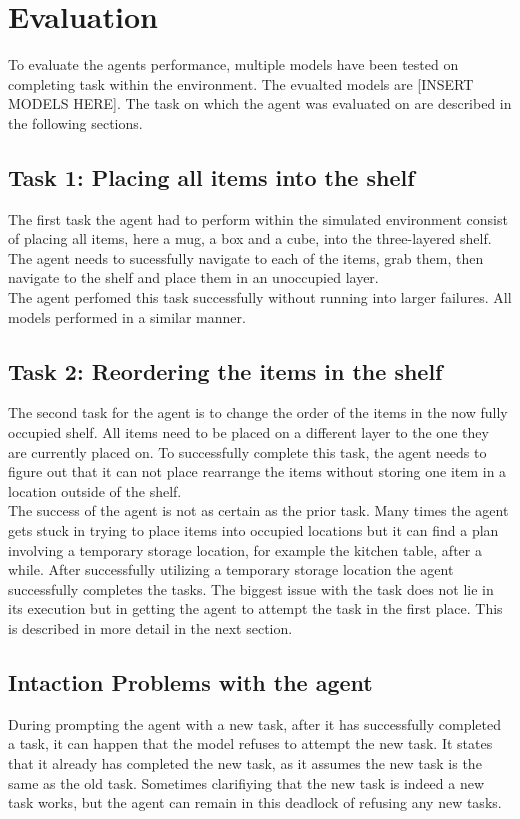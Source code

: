 \documentclass[../report.tex]{subfiles}
\begin{document}
\section{Evaluation}
\label{sec:evaluation}
To evaluate the agents performance, multiple models have been tested on completing task within the environment. The evualted models are [INSERT MODELS HERE]. The task on which the agent was evaluated on are described in the following sections.

\subsection{Task 1: Placing all items into the shelf}
The first task the agent had to perform within the simulated environment consist of placing all items, here a mug, a box and a cube, into the three-layered shelf. The agent needs to sucessfully navigate to each of the items, grab them, then navigate to the shelf and place them in an unoccupied layer. \\
The agent perfomed this task successfully without running into larger failures. All models performed in a similar manner.

\subsection{Task 2: Reordering the items in the shelf}
The second task for the agent is to change the order of the items in the now fully occupied shelf. All items need to be placed on a different layer to the one they are currently placed on. To successfully complete this task, the agent needs to figure out that it can not place rearrange the items without storing one item in a location outside of the shelf. \\
The success of the agent is not as certain as the prior task. Many times the agent gets stuck in trying to place items into occupied locations but it can find a plan involving a temporary storage location, for example the kitchen table, after a while. After successfully utilizing a temporary storage location the agent successfully completes the tasks. The biggest issue with the task does not lie in its execution but in getting the agent to attempt the task in the first place. This is described in more detail in the next section.

\subsection{Intaction Problems with the agent}
During prompting the agent with a new task, after it has successfully completed a task, it can happen that the model refuses to attempt the new task. It states that it already has completed the new task, as it assumes the new task is the same as the old task. Sometimes clarifiying that the new task is indeed a new task works, but the agent can remain in this deadlock of refusing any new tasks.
\end{document}
